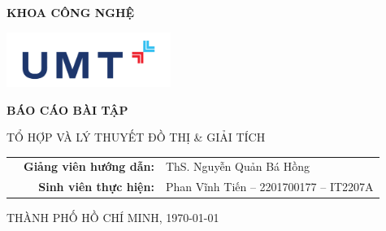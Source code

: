 \documentclass[12pt, a4paper, english]{article}
\begin{document}
  \begin{titlepage}
    \begin{center}
      \fontsize{11}{8}\selectfont {} \\
      \fontsize{11}{8}\selectfont {} \\        
      \fontsize{11}{8}\selectfont \textbf{KHOA CÔNG NGHỆ}

      \includegraphics[width=0.4\textwidth]{Logo/UMT_1.jpg}

      \vspace*{5.5cm}
          
      \Huge
      \textbf{BÁO CÁO BÀI TẬP}
          
      \Large
      TỔ HỢP VÀ LÝ THUYẾT ĐỒ THỊ \& GIẢI TÍCH
          
      \vspace{2cm}

      \Large
      \begin{table}[h]
        \begin{tabular}{rrl}
          \fontsize{12}{8}\selectfont
          \hspace{2.5 cm} 
          & \textbf{Giảng viên hướng dẫn:}  & ThS. Nguyễn Quản Bá Hồng \\
          \newline
          & \textbf{Sinh viên thực hiện:}   & Phan Vĩnh Tiến -- 2201700177 -- IT2207A \\
        \end{tabular}
      \end{table} 

      \vfill
      \vspace{9cm}
      
      \MakeUppercase{\fontsize{12}{8}\selectfont THÀNH PHỐ HỒ CHÍ MINH, \today}
    \end{center}
  \end{titlepage}
  \newpage
\end{document}
